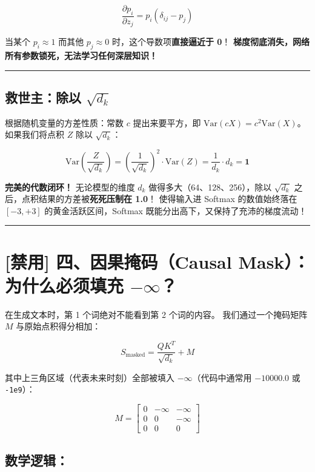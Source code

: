 \[
\frac{\partial p_i}{\partial z_j} = p_i (\delta_{ij} - p_j)
\]

当某个 $p_i \approx 1$ 而其他 $p_j \approx 0$ 时，这个导数项\textbf{直接逼近于 0}！
\textbf{梯度彻底消失，网络所有参数锁死，无法学习任何深层知识！}

\vspace{0.8em}\hrule\vspace{0.8em}

\subsection{救世主：除以 $\sqrt{d_k}$}

根据随机变量的方差性质：常数 $c$ 提出来要平方，即 $\text{Var}(c X) = c^2 \text{Var}(X)$。
如果我们将点积 $Z$ 除以 $\sqrt{d_k}$：

\[
\text{Var}\left(\frac{Z}{\sqrt{d_k}}\right) = \left(\frac{1}{\sqrt{d_k}}\right)^2 \cdot \text{Var}(Z) = \frac{1}{d_k} \cdot d_k = \mathbf{1}
\]

\textbf{完美的代数闭环！}
无论模型的维度 $d_k$ 做得多大（64、128、256），除以 $\sqrt{d_k}$ 之后，点积结果的方差被\textbf{死死压制在 1.0}！
使得输入进 Softmax 的数值始终落在 $[-3, +3]$ 的黄金活跃区间，Softmax 既能分出高下，又保持了充沛的梯度流动！

\vspace{0.8em}\hrule\vspace{0.8em}

\section{[禁用] 四、因果掩码（Causal Mask）：为什么必须填充 $-\infty$？}

在生成文本时，第 1 个词绝对不能看到第 2 个词的内容。
我们通过一个掩码矩阵 $M$ 与原始点积得分相加：

\[
S_{\text{masked}} = \frac{Q K^T}{\sqrt{d_k}} + M
\]

其中上三角区域（代表未来时刻）全部被填入 $-\infty$（代码中通常用 $-10000.0$ 或 \texttt{-1e9}）：

\[
M = \begin{bmatrix}
0 & -\infty & -\infty \\
0 & 0 & -\infty \\
0 & 0 & 0
\end{bmatrix}
\]

\subsection{数学逻辑：}


